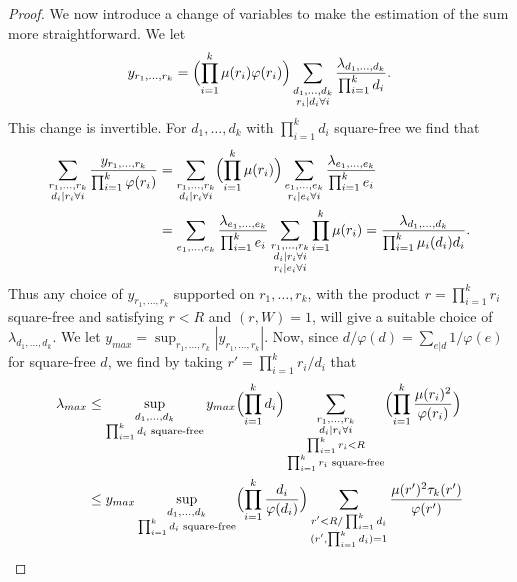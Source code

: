 \documentclass[12pt,a4paper]{amsart}
\theoremstyle{plain}
\numberwithin{sblmm}{thrm}
\numberwithin{equation}{section}
\renewcommand{\phi}{\varphi}
\begin{document}
\begin{proof}
We now introduce a change of variables to make the estimation of the sum more straightforward. We let
\begin{equation}
y_{r_1,\dotsc,r_k}=\Bigl(\prod_{i=1}^k\mu(r_i)\phi(r_i)\Bigr)\sum_{\substack{d_1,\dotsc,d_k\\ r_i|d_i\forall i}}\frac{\lambda_{d_1,\dotsc,d_k}}{\prod_{i=1}^kd_i}.\label{eq:YLambdaDef}
\end{equation}
This change is invertible. For $d_1,\dotsc,d_k$ with $\prod_{i=1}^kd_i$ square-free we find that
\begin{align}
\sum_{\substack{r_1,\dotsc, r_k\\ d_i|r_i\forall i}}\frac{y_{r_1,\dotsc,r_k}}{\prod_{i=1}^k\phi(r_i)}&=\sum_{\substack{r_1,\dotsc,r_k\\ d_i|r_i\forall i}}\Bigl(\prod_{i=1}^k\mu(r_i)\Bigr)\sum_{\substack{e_1,\dotsc,e_k\\r_i|e_i\forall i}}\frac{\lambda_{e_1,\dotsc,e_k}}{\prod_{i=1}^ke_i}\nonumber\\
&=\sum_{e_1,\dotsc,e_k}\frac{\lambda_{e_1,\dotsc,e_k}}{\prod_{i=1}^ke_i}\sum_{\substack{r_1,\dotsc,r_k\\d_i|r_i\forall i\\ r_i|e_i\forall i}}\prod_{i=1}^k\mu(r_i)=\frac{\lambda_{d_1,\dotsc,d_k}}{\prod_{i=1}^k\mu_i(d_i)d_i}.\label{eq:LambdaYDef}
\end{align}
Thus any choice of $y_{r_1,\dotsc,r_k}$ supported on $r_1,\dotsc,r_k$, with the product $r=\prod_{i=1}
^kr_i$ square-free and satisfying $r<R$ and $(r,W)=1$, will give a suitable choice of $\lambda_{d_1,\dotsc,d_k}$. We let $y_{max}=\sup_{r_1,\dotsc, r_k}|y_{r_1,\dotsc,r_k}|$. Now, since $d/\phi(d)=\sum_{e|d}1/\phi(e)$ for square-free $d$, we find by taking $r'=\prod_{i=1}^kr_i/d_i$ that
\begin{align}
\lambda_{max}&\le \sup_{\substack{d_1,\dotsc,d_k\\ \prod_{i=1}^kd_i \text{ square-free}}}y_{max}\Bigl(\prod_{i=1}^kd_i\Bigr)\sum_{\substack{r_1,\dotsc,r_k \\d_i|r_i\forall i\\ \prod_{i=1}^k r_i<R\\ \prod_{i=1}^k r_i \text{ square-free}}}\Bigl(\prod_{i=1}^k\frac{\mu(r_i)^2}{\phi(r_i)}\Bigr)\nonumber\\
&\le y_{max} \sup_{\substack{d_1,\dotsc,d_k\\ \prod_{i=1}^kd_i \text{ square-free}}}\Bigl(\prod_{i=1}^k\frac{d_i}{\phi(d_i)}\Bigr)\sum_{\substack{r'<R/\prod_{i=1}^kd_i\\ (r',\prod_{i=1}^kd_i)=1}}\frac{\mu(r')^2\tau_k(r')}{\phi(r')}\nonumber\\

\end{align}
\end{proof}
\end{document}

